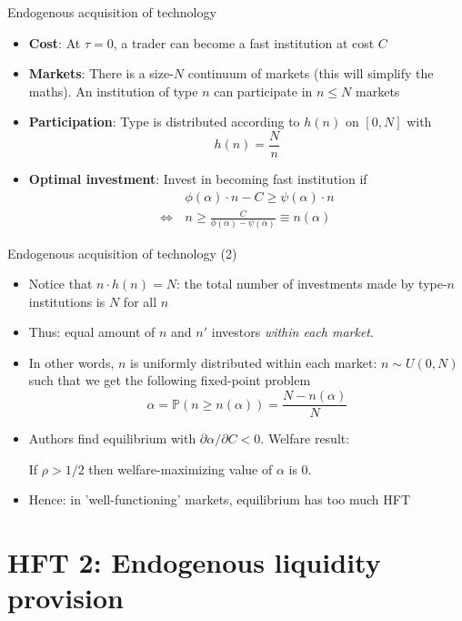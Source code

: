 \documentclass[english,10pt
,aspectratio=169
]{beamer}
\begin{document}
\begin{frame}{Endogenous acquisition of technology}
	\begin{itemize}
		\item \textbf{Cost}: At $\tau=0$, a trader can become a fast institution at cost $C$
		\item \textbf{Markets}: There is a size-$N$ continuum of markets (this will simplify the maths). An institution of type $n$ can participate in $n \leq N$ markets
		\item \textbf{Participation}: Type is distributed according to $h(n)$ on $[0, N]$ with
		\[
		h(n) = \frac{N}{n}
		\]
		\item \textbf{Optimal investment}: Invest in becoming fast institution if
		\begin{align*}
		& \phi(\alpha) \cdot n - C \geq \psi(\alpha) \cdot n  \\
		\Leftrightarrow \, & n \geq \frac{C}{\phi(\alpha)-\psi(\alpha)} \equiv n(\alpha)
		\end{align*}
	\end{itemize}
\end{frame}


\begin{frame}{Endogenous acquisition of technology (2)}
	\begin{itemize}
		\item Notice that $n \cdot h(n)=N$: the total number of investments made by type-$n$ institutions is $N$ for all $n$
		\item Thus: equal amount of $n$ and $n'$ investors \textit{within each market}.
		\item In other words, $n$ is uniformly distributed within each market: $n \sim U(0,N)$ such that  we get the following fixed-point problem
		\[
		\alpha = \mathbb{P}(n \ge n(\alpha))=\frac{N-n(\alpha)}{N}
		\]
		\item Authors find equilibrium with $\partial \alpha / \partial C<0$. Welfare result:
		\begin{block}{}
			\begin{center}
				If $\rho>1/2$ then welfare-maximizing value of $\alpha$ is 0.
			\end{center}
		\end{block}
		\item Hence: in 'well-functioning' markets, equilibrium has too much HFT
	\end{itemize}
\end{frame}


\section{HFT 2: Endogenous liquidity provision}
\end{document}
